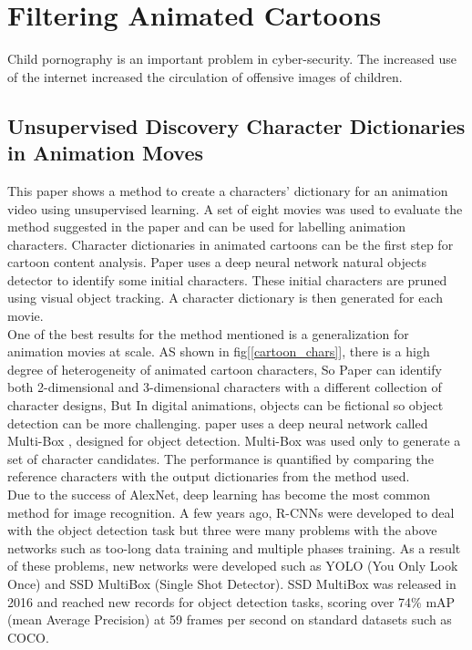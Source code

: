 \documentclass[runningheads]{llncs}
\begin{document}
\section{Filtering Animated Cartoons}

Child pornography \cite{tate1990child} is an important problem in cyber-security. The increased use of the internet increased the circulation of offensive images of children.

\subsection{Unsupervised Discovery Character Dictionaries in Animation Moves \cite{somandepalli2018unsupervised}}

This paper \cite{somandepalli2018unsupervised} shows a method to create a characters' dictionary for an animation video using unsupervised learning. A set of eight movies was used to evaluate the method suggested in the paper and can be used for labelling animation characters. Character dictionaries in animated cartoons can be the first step for cartoon content analysis. Paper \cite{somandepalli2018unsupervised} uses a deep neural network natural objects detector to identify some initial characters. These initial characters are pruned using visual object tracking. A character dictionary is then generated for each movie.\\

One of the best results for the method mentioned is a generalization for animation movies \cite{zheng2004blocking} at scale. AS shown in fig[\ref{cartoon_chars}], there is a high degree of heterogeneity of animated cartoon characters, So Paper \cite{somandepalli2018unsupervised} can identify both 2-dimensional and 3-dimensional characters with a different collection of character designs, But In digital animations, objects can be fictional so object detection can be more challenging. paper \cite{somandepalli2018unsupervised} uses a deep neural network called Multi-Box \cite{erhan2014scalable} , \cite{szegedy2014scalable} designed for object detection. Multi-Box was used only to generate a set of character candidates. The performance is quantiﬁed by comparing the reference characters with the output dictionaries from the method used.\\

Due to the success of AlexNet, deep learning has become the most common method for image recognition. A few years ago, R-CNNs were developed to deal with the object detection task but three were many problems with the above networks such as too-long data training and multiple phases training. As a result of these problems, new networks were developed such as YOLO (You Only Look Once) and SSD MultiBox (Single Shot Detector). SSD MultiBox was released in 2016 and reached new records for object detection tasks, scoring over 74\% mAP (mean Average Precision) at 59 frames per second on standard datasets such as COCO.\\
\end{document}
